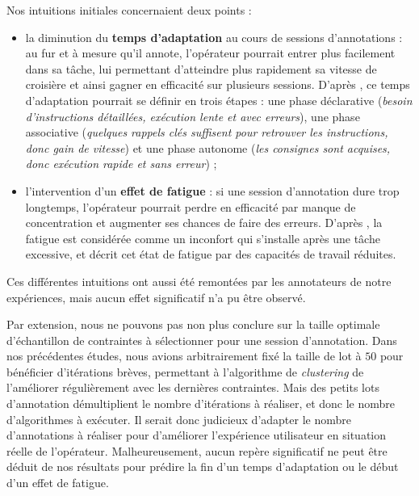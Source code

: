 			\begin{leftBarAuthorOpinion}
				Nos intuitions initiales concernaient deux points :
				\begin{itemize}
					\item la diminution du \textbf{temps d'adaptation} au cours de sessions d'annotations : au fur et à mesure qu'il annote, l'opérateur pourrait entrer plus facilement dans sa tâche, lui permettant d'atteindre plus rapidement sa vitesse de croisière et ainsi gagner en efficacité sur plusieurs sessions. D'après \cite{anderson:2013:architecture-cognition}, ce temps d'adaptation pourrait se définir en trois étapes : une phase déclarative (\textit{besoin d'instructions détaillées, exécution lente et avec erreurs}), une phase associative (\textit{quelques rappels clés suffisent pour retrouver les instructions, donc gain de vitesse}) et une phase autonome (\textit{les consignes sont acquises, donc exécution rapide et sans erreur}) ;
					\item l'intervention d'un \textbf{effet de fatigue} : si une session d'annotation dure trop longtemps, l'opérateur pourrait perdre en efficacité par manque de concentration et augmenter ses chances de faire des erreurs. D'après \cite{jones-etal:2015:demographic-occupational-predictors}, la fatigue est considérée comme un inconfort qui s'installe après une tâche excessive, et \cite{elkosantini-gien:2009:integration-human-behavioural} décrit cet état de fatigue par des capacités de travail réduites.
				\end{itemize}
				Ces différentes intuitions ont aussi été remontées par les annotateurs de notre expériences, mais aucun effet significatif n'a pu être observé.
			\end{leftBarAuthorOpinion}
		
			Par extension, nous ne pouvons pas non plus conclure sur la taille optimale d’échantillon de contraintes à sélectionner pour une session d'annotation.
			Dans nos précédentes études, nous avions arbitrairement fixé la taille de lot à $50$ pour bénéficier d'itérations brèves, permettant à l'algorithme de \textit{clustering} de l'améliorer régulièrement avec les dernières contraintes.
			Mais des petits lots d'annotation démultiplient le nombre d'itérations à réaliser, et donc le nombre d'algorithmes à exécuter.
			Il serait donc judicieux d'adapter le nombre d'annotations à réaliser pour d'améliorer l'expérience utilisateur en situation réelle de l'opérateur.
			Malheureusement, aucun repère significatif ne peut être déduit de nos résultats pour prédire la fin d'un temps d'adaptation ou le début d'un effet de fatigue.
			
